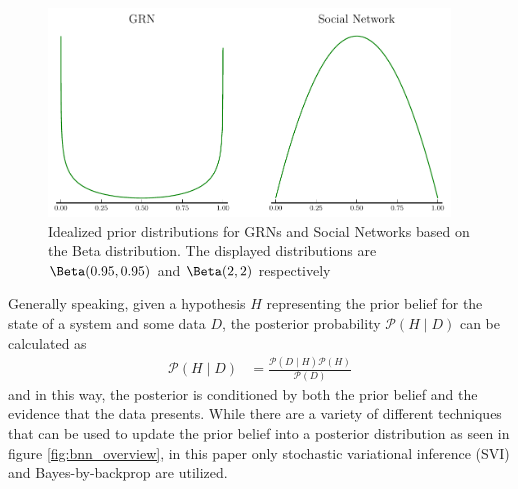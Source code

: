 \begin{figure}[t]
  \centering
  \includegraphics[width=0.95\textwidth]{images/prior.pdf}
  \caption{Idealized prior distributions for GRNs and Social Networks based on the Beta distribution. The displayed distributions are $\Beta(0.95, 0.95)$ and $\Beta(2, 2)$ respectively}
  \label{fig:prior}
\end{figure}
Generally speaking, given a hypothesis $H$ representing the prior belief for the state of a system and some data $D$, the posterior probability $\mathcal{P}(H\mid D)$ can be calculated as
\begin{align*}
  \mathcal{P}(H\mid D) &= \frac{\mathcal{P}(D\mid H)\mathcal{P}(H)}{\mathcal{P}(D)}
\end{align*}
and in this way, the posterior is conditioned by both the prior belief and the evidence that the data presents. While there are a variety of different techniques that can be used to update the prior belief into a posterior distribution as seen in figure \ref{fig:bnn_overview}, in this paper only stochastic variational inference (SVI) and Bayes-by-backprop are utilized. 

